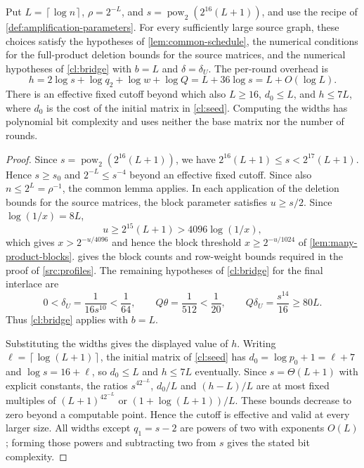 \documentclass[11pt,letterpaper]{article} \usepackage[utf8]{inputenc}
\theoremstyle{plain} \newtheorem{theorem}{Theorem}[section]
\theoremstyle{definition} \newaliascnt{definition}{theorem}
\newcommand{\ceil}[1]{\left\lceil#1\right\rceil}
\begin{document}
\begin{lemma}\label{lem:full-schedule}
Put $L=\ceil{\log n}$, $\rho=2^{-L}$, and
$s=\operatorname{pow}_2(2^{16}(L+1))$, and use the recipe of \cref{def:amplification-parameters}.
For every sufficiently large source graph, these choices satisfy the hypotheses of
\cref{lem:common-schedule}, the numerical conditions for the full-product deletion bounds for the source matrices, and
the numerical hypotheses of \cref{cl:bridge} with $b=L$ and $\delta=\delta_U$. The per-round overhead is
\[
h=2\log s+\log q_2+\log w+\log Q=L+36\log s=L+O(\log L).
\]
There is an effective fixed cutoff beyond which also
$L\ge16$, $d_0\le L$, and $h\le7L$, where $d_0$ is the cost of the initial matrix in
\cref{cl:seed}. Computing the widths has polynomial bit complexity and
uses neither the base matrix nor the number of rounds.
\end{lemma}

\begin{proof}
Since $s=\operatorname{pow}_2(2^{16}(L+1))$, we have $2^{16}(L+1)\le s<2^{17}(L+1)$. Hence $s\ge s_0$ and
$2^{-L}\le s^{-4}$ beyond an effective fixed cutoff. Since also
$n\le2^L=\rho^{-1}$, the common lemma applies. In each application of the deletion bounds for the source matrices, the block parameter
satisfies $u\ge s/2$. Since $\log(1/x)=8L$,
\[
u\ge2^{15}(L+1)>4096\log(1/x),
\]
which gives $x>2^{-u/4096}$ and hence the block threshold
$x\ge2^{-u/1024}$ of \cref{lem:many-product-blocks}. 
gives the block counts and row-weight bounds required in the proof of \cref{src:profiles}.
The remaining hypotheses of \cref{cl:bridge} for the final interlace are
\[
0<\delta_U=\frac1{16s^{10}}<\frac1{64},\qquad
Q\theta=\frac1{512}<\frac1{20},\qquad
Q\delta_U=\frac{s^{14}}{16}\ge80L.
\]
Thus \cref{cl:bridge} applies with $b=L$.

Substituting the widths gives the displayed value of $h$. Writing
$\ell=\ceil{\log(L+1)}$, the initial matrix of \cref{cl:seed} has $d_0=\log p_0+1=\ell+7$ and
$\log s=16+\ell$, so $d_0\le L$ and $h\le7L$ eventually.
Since $s=\Theta(L+1)$ with explicit constants, the ratios $s^42^{-L}$,
$d_0/L$ and $(h-L)/L$ are at most fixed multiples of $(L+1)^42^{-L}$ or
$(1+\log(L+1))/L$. These bounds decrease to zero beyond a computable point.
Hence the cutoff is effective and valid at every larger size. All widths except $q_1=s-2$ are powers of two
with exponents $O(L)$; forming those powers and subtracting two from $s$ gives the stated bit complexity.
\end{proof}
\end{document}
